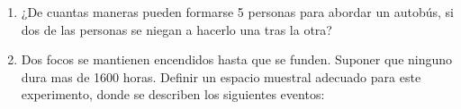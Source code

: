 \begin{enumerate}
\begin{enumerate}
\begin{proof}
            \end{proof}
            \item $\sum_{r=0}^{n} \binom{n}{r} {(a-1)}^r = a^n $
            \begin{proof}
                \begin{gather*}
                a^n ={(a+1-1)}^n = {[1+(a-1)]}^n = \sum_{r=0}^{n} \binom{n}{r} (1^{n-r}) {(a-1)}^r\\
                \end{gather*}
                \begin{gather*}
                \sum_{r=0}^{n} \binom{n}{r} {(a-1)}^r = a^n\\
                \end{gather*}
            \end{proof}
            \item $ \sum_{r=0}^{n} {\binom{n}{r}}^2 =\binom{2n}{n} $
            \begin{proof}
                \begin{gather*}
                \sum_{r=0}^{n} {\binom{n}{r}}^2 =\binom{2n}{n}\\ 
                \end{gather*}
                \begin{gather*}
                {(1+x)}^{2n} = {(1+x)}^n * {(1+x)}^n = \sum_{r=0}^{n} (\sum_{r=0}^{n} \binom{n}{j} \binom{n}{r-j} x^k)\\ 
                \end{gather*}
                \begin{gather*}
                {(1+x)}^{2n} = \sum_{k=0}^{2n} \binom{2n}{k} x^k\\ 
                \end{gather*}
                \begin{gather*}
                \binom{2n}{n} = \sum_{j=0}^{n} \binom{n}{j} \binom{n}{n-j} = \sum_{j=0}^{n} {\binom{n}{j}}^2\\ 
                \end{gather*}
            \end{proof}
        \end{enumerate}
    \item ¿De cuantas maneras pueden formarse 5 personas para abordar un autobús, si dos de las personas se niegan a hacerlo una tras la otra?
    \item Dos focos se mantienen encendidos hasta que se funden. Suponer que ninguno dura mas de 1600 		horas. Definir un espacio muestral adecuado para este experimento, donde se describen los siguientes eventos:\\
    

\end{enumerate}
